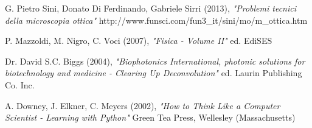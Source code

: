 \begin{thebibliography}{3}
 G. Pietro Sini, Donato Di Ferdinando, Gabriele Sirri (2013), \emph{"Problemi tecnici della microscopia ottica"} \newline http://www.funsci.com/fun3\_it/sini/mo/m\_ottica.htm

 P. Mazzoldi, M. Nigro, C. Voci (2007), \emph{"Fisica - Volume II"} \newline ed. EdiSES

 Dr. David S.C. Biggs (2004), \emph{"Biophotonics International, photonic solutions for biotechnology and medicine - Clearing Up Deconvolution"} \newline ed. Laurin Publishing Co. Inc.

 A. Downey, J. Elkner, C. Meyers (2002), \emph{"How to Think Like a Computer Scientist - Learning with Python"} \newline Green Tea Press, Wellesley (Massachusetts)

\end{thebibliography} 